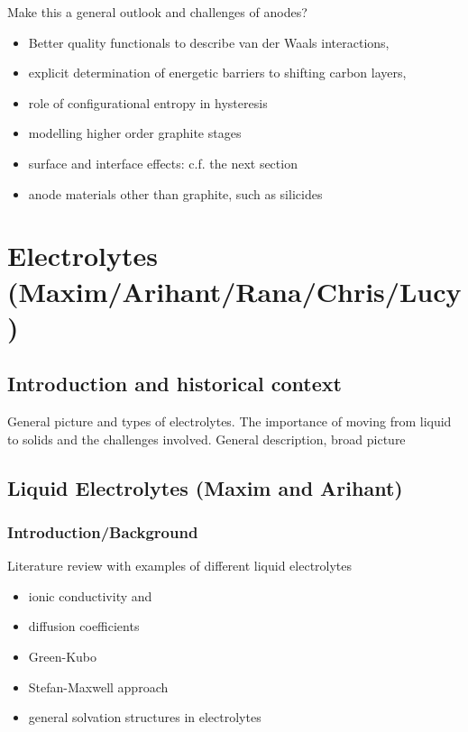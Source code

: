 \documentclass[journal=jacsat,manuscript=article]{achemso}
\begin{document}
Make this a general outlook and challenges of anodes?
\begin{itemize}
    \item Better quality functionals to describe van der Waals interactions, 
    \item explicit determination of energetic barriers to shifting carbon layers, 
    \item role of configurational entropy in hysteresis 
    \item modelling higher order graphite stages
    \item surface and interface effects: c.f. the next section
    \item anode materials other than graphite, such as silicides
\end{itemize}

\section{Electrolytes (Maxim/Arihant/Rana/Chris/Lucy)}
\subsection{Introduction and historical context}
General picture and types of electrolytes. The importance of moving from liquid to solids and the challenges involved.
General description, broad picture

\subsection{Liquid Electrolytes (Maxim and Arihant)}
\subsubsection{Introduction/Background}
Literature review with examples of different liquid electrolytes
\begin{itemize}
    \item ionic conductivity and 
    \item diffusion coefficients
    \item Green-Kubo
    \item Stefan-Maxwell approach
    \item general solvation structures in electrolytes
\end{itemize}
\end{document}
